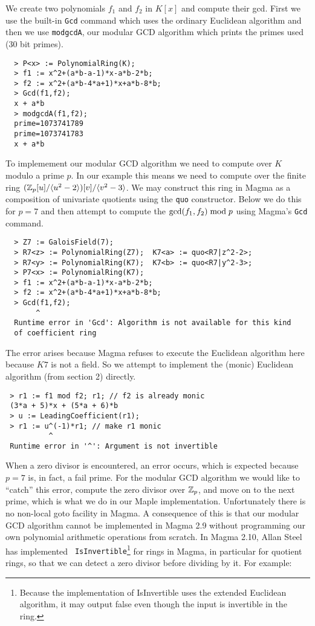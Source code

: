 \documentclass[10pt]{article}
\begin{document}
\noindent
We create two polynomials $f_1$ and $f_2$ in $K[x]$ and
compute their gcd.  First we use the built-in {\tt Gcd} command
which uses the ordinary Euclidean algorithm and then we use {\tt modgcdA},
our modular GCD algorithm which prints the primes used (30 bit primes).

{ \small
\begin{verbatim}
  > P<x> := PolynomialRing(K);
  > f1 := x^2+(a*b-a-1)*x-a*b-2*b;
  > f2 := x^2+(a*b-4*a+1)*x+a*b-8*b;
  > Gcd(f1,f2);
  x + a*b
  > modgcdA(f1,f2);
  prime=1073741789
  prime=1073741783
  x + a*b
\end{verbatim}
}

\noindent
To implemement our modular GCD algorithm we need to compute over $K$ modulo
a prime $p$.  In our example this means we need to compute over the
finite ring $({\mathbb Z}_p[u]/ \langle u^2-2 \rangle )[v]/ \langle v^2-3 \rangle$.
We may construct this ring in Magma as a composition of univariate
quotients using the {\tt quo} constructor.  Below we do this for $p=7$ and
then attempt to compute the ${\rm gcd}(f_1,f_2) \bmod p$
using Magma's {\tt Gcd} command.

{ \small
\begin{verbatim}
  > Z7 := GaloisField(7);
  > R7<z> := PolynomialRing(Z7);  K7<a> := quo<R7|z^2-2>;
  > R7<y> := PolynomialRing(K7);  K7<b> := quo<R7|y^2-3>;
  > P7<x> := PolynomialRing(K7);
  > f1 := x^2+(a*b-a-1)*x-a*b-2*b;
  > f2 := x^2+(a*b-4*a+1)*x+a*b-8*b;
  > Gcd(f1,f2);
       ^
  Runtime error in 'Gcd': Algorithm is not available for this kind
  of coefficient ring
\end{verbatim}
}

\noindent
The error arises because Magma refuses to execute the Euclidean
algorithm here because $K7$ is not a field.  So we attempt to
implement the (monic) Euclidean algorithm (from section 2) directly.

{ \small
\begin{verbatim}
 > r1 := f1 mod f2; r1; // f2 is already monic
 (3*a + 5)*x + (5*a + 6)*b
 > u := LeadingCoefficient(r1);
 > r1 := u^(-1)*r1; // make r1 monic
          ^
 Runtime error in '^': Argument is not invertible
\end{verbatim}
}

\noindent When a zero divisor is encountered, an error occurs, which
is expected because $p=7$ is, in fact, a fail prime. For the modular
GCD algorithm we would like to ``catch'' this error, compute the
zero divisor over ${\mathbb Z}_p$, and move on to the next prime, which is
what we do in our Maple implementation.  Unfortunately there is no
non-local goto facility in Magma.  A consequence of this is that our
modular GCD algorithm cannot be implemented in Magma 2.9 without
programming our own polynomial arithmetic operations from scratch.
In Magma 2.10, Allan Steel has implemented {\tt
IsInvertible}\footnote{Because the implementation of IsInvertible
uses the extended Euclidean algorithm, it may output false even
though the input is invertible in the ring.} for rings in Magma, in
particular for quotient rings, so that we can detect a zero divisor
before dividing by it. For example:
\end{document}
